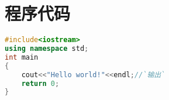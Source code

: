 \newpage
\section{程序代码}
\begin{lstlisting}[language=C++,escapeinside=``]
#include<iostream>
using namespace std;
int main
{
	cout<<"Hello world!"<<endl;//`输出`
	return 0;
}
\end{lstlisting}
